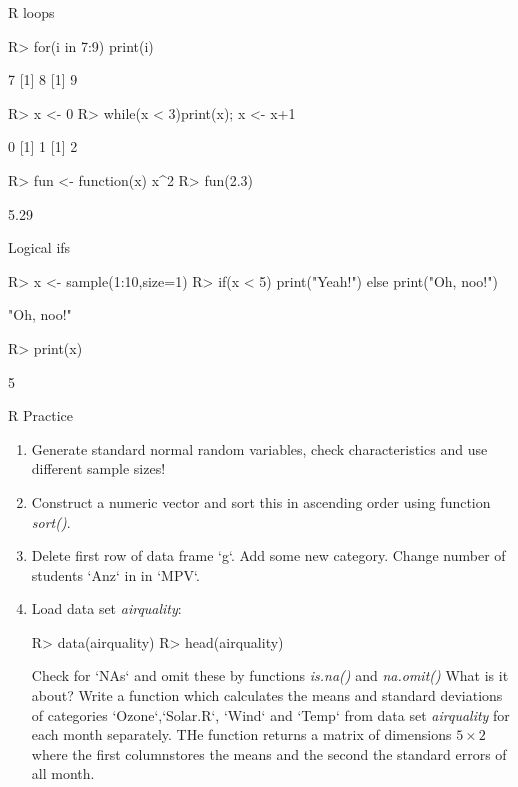 \documentclass[10pt]{beamer}
\let\proglang=\textsf
\begin{document}
\begin{frame}[fragile]{\proglang{R} loops}
\begin{Schunk}
\begin{Sinput}
R> for(i in 7:9) {print(i)}
\end{Sinput}
\begin{Soutput}
[1] 7
[1] 8
[1] 9
\end{Soutput}
\begin{Sinput}
R> x <- 0
R> while(x < 3){print(x); x <- x+1}
\end{Sinput}
\begin{Soutput}
[1] 0
[1] 1
[1] 2
\end{Soutput}
\begin{Sinput}
R> fun <- function(x) x^2
R> fun(2.3)
\end{Sinput}
\begin{Soutput}
[1] 5.29
\end{Soutput}
\end{Schunk}
Logical ifs
\begin{Schunk}
\begin{Sinput}
R> x <- sample(1:10,size=1)
R> if(x < 5) {print("Yeah!")} else {print("Oh, noo!")}
\end{Sinput}
\begin{Soutput}
[1] "Oh, noo!"
\end{Soutput}
\begin{Sinput}
R> print(x)
\end{Sinput}
\begin{Soutput}
[1] 5
\end{Soutput}
\end{Schunk}
\end{frame}
%
\begin{frame}[fragile]{\proglang{R} Practice}
\begin{enumerate}
 \item Generate standard normal random variables, check characteristics and use
 different sample sizes!
 \item Construct a numeric vector and sort this in ascending order using
 function \textit{sort()}.
 \item Delete first row of data frame `g`. Add some new category. Change number
 of students `Anz` in in `MPV`.
 \item Load data set \textit{airquality}:
\begin{Schunk}
\begin{Sinput}
R> data(airquality)
R> head(airquality)
\end{Sinput}
\end{Schunk}
Check for `NAs` and omit these by functions \textit{is.na()} and
\textit{na.omit()} What is it about? Write a function
 which calculates the means and standard deviations of categories `Ozone`,`Solar.R`, `Wind` and `Temp` from data set
 \textit{airquality} for each month separately. THe function returns a matrix of
 dimensions $5\times 2$ where the first columnstores the means and the second
 the standard errors of all month.
\end{enumerate}
\end{frame}
\end{document}
